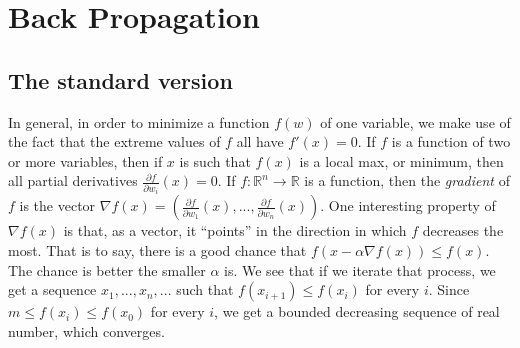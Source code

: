 \documentclass[10pt]{amsart}
\newcommand{\R}{\mathbb{R}}
\theoremstyle{definition}
\begin{document}
\begin{center}
\end{center}

\section{Back Propagation}

\subsection{The standard version} In general, in order to minimize a function $f(w)$ of one variable, we make use of the fact that the extreme values of $f$ all have $f'(x)=0$.  If $f$ is a function of two or more variables, then if $x$ is such that $f(x)$ is a local max, or minimum, then all partial derivatives $\frac{\partial f}{\partial w_i}(x)=0$.  If $f:\R^n\to\R$ is a function, then the {\em gradient} of $f$ is the vector $\nabla f(x) = \left(\frac{\partial f}{\partial w_1}(x),...,\frac{\partial f}{\partial w_n}(x)\right)$. One interesting property of $\nabla f(x)$ is that, as a vector, it ``points'' in the direction in which $f$ decreases the most.  That is to say, there is a good chance that $f(x-\alpha\nabla f(x))\leq f(x)$. The chance is better the smaller $\alpha$ is.  We see that if we iterate that process, we get a sequence $x_1,...,x_n,...$ such that $f(x_{i+1})\leq f(x_i)$ for every $i$.  Since $m\leq f(x_i)\leq f(x_0)$ for every $i$, we get a bounded decreasing sequence of real number, which converges.
\end{document}
